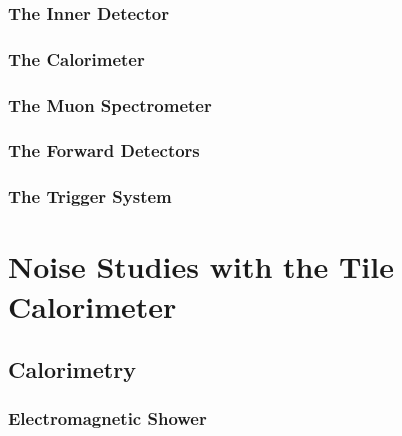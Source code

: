 \documentclass[10pt,twoside,cucitura,classica,english,openany]{toptesi}
\begin{document}
\subsection{The Inner Detector}
\label{sec:inner-detector}



\subsection{The Calorimeter}
\label{sec:calorimeters}



\subsection{The Muon Spectrometer}
\label{sec:muon-spectrometer}



\subsection{The Forward Detectors}
\label{sec:forward-detectors}



\subsection{The Trigger System}
\label{sec:trigger-system}



\chapter{Noise Studies with the Tile Calorimeter}
\label{cha:noise-studies-with}

\section{Calorimetry}
\label{sec:calorimetry}



\subsection{Electromagnetic Shower}
\label{sec:electr-show}


\end{document}

